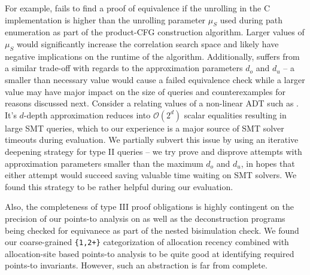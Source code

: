 For example, \toolName{} fails to find a proof of equivalence if the unrolling
in the C implementation is higher than the unrolling parameter $\mu_S$ used during path
enumeration as part of the product-CFG construction algorithm.
Larger values of $\mu_S$ would significantly increase the correlation search space and likely
have negative implications on the runtime of the algorithm.
Additionally, \toolName{} suffers from a similar trade-off with regards to the approximation parameters $d_o$ and $d_u$
-- a smaller than necessary value would cause a failed equivalence check while a larger value may
have major impact on the size of queries and counterexamples for reasons discussed next.
Consider a \recursiveRelation{} relating values of a non-linear ADT such as .
It's $d$-depth approximation reduces into $\mathcal{O}(2^d)$ scalar equalities resulting in large SMT queries,
which to our experience is a major source of SMT solver timeouts during evaluation.
We partially subvert this issue by using an iterative deepening strategy for type II queries --
we try prove and disprove attempts with approximation parameters smaller than the maximum $d_o$ and $d_u$,
in hopes that either attempt would succeed saving valuable
time waiting on SMT solvers.
We found this strategy to be rather helpful during our evaluation.

Also, the completeness of type III proof obligations is highly contingent on the precision
of our points-to analysis on \cprog{} as well as the deconstruction programs being
checked for equivanece as part of the nested bisimulation check.
We found our coarse-grained {\tt \{1,2+\}} categorization of allocation recency
combined with allocation-site based points-to analysis to be quite good at
identifying required points-to invariants.
However, such an abstraction is far from complete.
